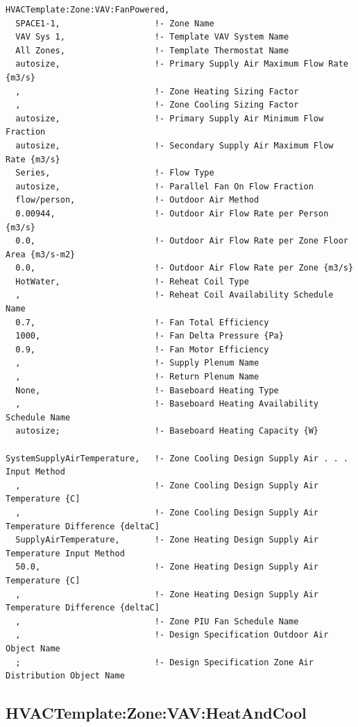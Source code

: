 \begin{lstlisting}
HVACTemplate:Zone:VAV:FanPowered,
  SPACE1-1,                   !- Zone Name
  VAV Sys 1,                  !- Template VAV System Name
  All Zones,                  !- Template Thermostat Name
  autosize,                   !- Primary Supply Air Maximum Flow Rate {m3/s}
  ,                           !- Zone Heating Sizing Factor
  ,                           !- Zone Cooling Sizing Factor
  autosize,                   !- Primary Supply Air Minimum Flow Fraction
  autosize,                   !- Secondary Supply Air Maximum Flow Rate {m3/s}
  Series,                     !- Flow Type
  autosize,                   !- Parallel Fan On Flow Fraction
  flow/person,                !- Outdoor Air Method
  0.00944,                    !- Outdoor Air Flow Rate per Person {m3/s}
  0.0,                        !- Outdoor Air Flow Rate per Zone Floor Area {m3/s-m2}
  0.0,                        !- Outdoor Air Flow Rate per Zone {m3/s}
  HotWater,                   !- Reheat Coil Type
  ,                           !- Reheat Coil Availability Schedule Name
  0.7,                        !- Fan Total Efficiency
  1000,                       !- Fan Delta Pressure {Pa}
  0.9,                        !- Fan Motor Efficiency
  ,                           !- Supply Plenum Name
  ,                           !- Return Plenum Name
  None,                       !- Baseboard Heating Type
  ,                           !- Baseboard Heating Availability Schedule Name
  autosize;                   !- Baseboard Heating Capacity {W}

SystemSupplyAirTemperature,   !- Zone Cooling Design Supply Air . . . Input Method
  ,                           !- Zone Cooling Design Supply Air Temperature {C]
  ,                           !- Zone Cooling Design Supply Air Temperature Difference {deltaC]
  SupplyAirTemperature,       !- Zone Heating Design Supply Air Temperature Input Method
  50.0,                       !- Zone Heating Design Supply Air Temperature {C]
  ,                           !- Zone Heating Design Supply Air Temperature Difference {deltaC]
  ,                           !- Zone PIU Fan Schedule Name
  ,                           !- Design Specification Outdoor Air Object Name
  ;                           !- Design Specification Zone Air Distribution Object Name
\end{lstlisting}

\subsection{HVACTemplate:Zone:VAV:HeatAndCool}\label{hvactemplatezonevavheatandcool}

